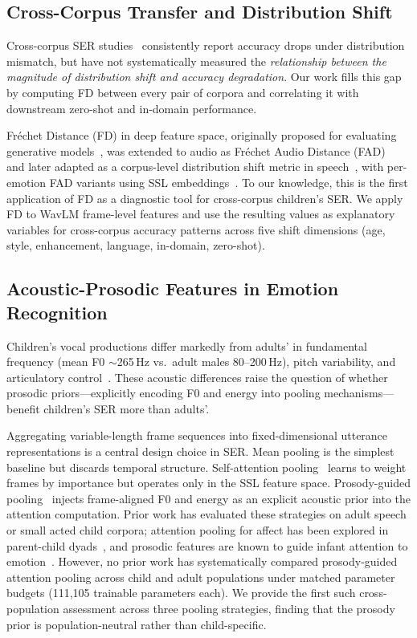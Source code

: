\documentclass[11pt,a4paper]{article}
\begin{document}
\subsection{Cross-Corpus Transfer and Distribution Shift}

Cross-corpus SER studies~\cite{schuller2010cross,latif2024cross} consistently
report accuracy drops under distribution mismatch, but have not systematically
measured the \textit{relationship between the magnitude of distribution shift
and accuracy degradation}. Our work fills this gap by computing FD between
every pair of corpora and correlating it with downstream zero-shot and
in-domain performance.

Fr\'{e}chet Distance (FD) in deep feature space, originally proposed for
evaluating generative models~\cite{heusel2017gans}, was extended to audio
as Fr\'echet Audio Distance (FAD)~\cite{kilgour2018fad} and later adapted as a
corpus-level distribution shift metric in speech~\cite{le2024dist}, with
per-emotion FAD variants using SSL embeddings~\cite{sun2024fad}. To our
knowledge, this is the first application of FD as a diagnostic tool for
cross-corpus children's SER. We apply FD to WavLM frame-level features and use
the resulting values as explanatory variables for cross-corpus accuracy patterns
across five shift dimensions (age, style, enhancement, language, in-domain,
zero-shot).

\subsection{Acoustic-Prosodic Features in Emotion Recognition}

Children's vocal productions differ markedly from adults' in fundamental
frequency (mean F0 $\sim$265\,Hz vs.\ adult males 80--200\,Hz),
pitch variability, and articulatory
control~\cite{lee2007interspeech,tavares2010normative}. These acoustic
differences raise the question of whether prosodic priors---explicitly
encoding F0 and energy into pooling mechanisms---benefit children's SER more
than adults'.

Aggregating variable-length frame sequences into fixed-dimensional utterance
representations is a central design choice in SER. Mean pooling is the
simplest baseline but discards temporal structure. Self-attention
pooling~\cite{lin2017structured} learns to weight frames by importance but
operates only in the SSL feature space. Prosody-guided
pooling~\cite{triantafyllopoulos2023prosody} injects frame-aligned F0 and
energy as an explicit acoustic prior into the attention computation. Prior work has evaluated these strategies on adult speech or small acted child
corpora; attention pooling for affect has been explored in parent-child
dyads~\cite{chen2023mit}, and prosodic features are known to guide infant
attention to emotion~\cite{kao2022jslhr}. However, no prior work has
systematically compared prosody-guided attention pooling across child and adult
populations under matched parameter budgets (111,105 trainable parameters
each). We provide the first such cross-population assessment across three
pooling strategies, finding that the prosody prior is population-neutral rather
than child-specific.
\end{document}
